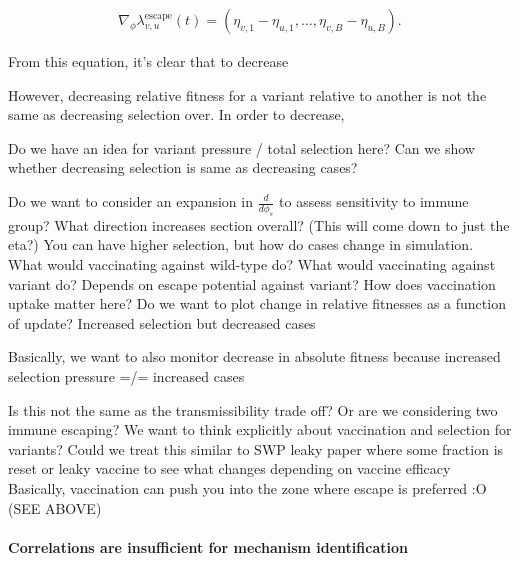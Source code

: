 \documentclass[12pt,oneside,letterpaper]{article}
\begin{document}
\begin{align*}
    \nabla_{\phi} \lambda^{\text{escape}}_{v,u}(t) = (\eta_{v,1} - \eta_{u,1}, \ldots, \eta_{v,B} - \eta_{u,B}).
\end{align*}

From this equation, it's clear that to decrease 




However, decreasing relative fitness for a variant relative to another is not the same as decreasing selection over.
In order to decrease, 

Do we have an idea for variant pressure / total selection here? Can we show whether decreasing selection is same as decreasing cases?

Do we want to consider an expansion in $\frac{d}{d\phi_{s}}$ to assess sensitivity to immune group? What direction increases section overall? (This will come down to just the eta?)
You can have higher selection, but how do cases change in simulation. What would vaccinating against wild-type do? What would vaccinating against variant do? Depends on escape potential against variant?
How does vaccination uptake matter here? Do we want to plot change in relative fitnesses as a function of update? Increased selection but decreased cases

Basically, we want to also monitor decrease in absolute fitness because increased selection pressure =/= increased cases


Is this not the same as the transmissibility trade off? Or are we considering two immune escaping?
We want to think explicitly about vaccination and selection for variants?
Could we treat this similar to SWP leaky paper where some fraction is reset or leaky vaccine to see what changes depending on vaccine efficacy
Basically, vaccination can push you into the zone where escape is preferred :O (SEE ABOVE)

\paragraph{Correlations are insufficient for mechanism identification}%
\end{document}
